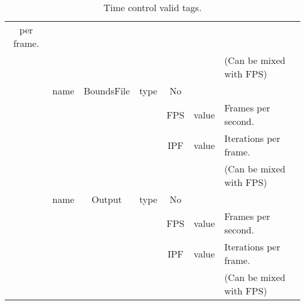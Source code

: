 \begin{table}[h!b!p!]
\begin{tabular}{| c | c | c | c | c | c | l | }
		       per frame. \\
		       &      &                &        &         &       & (Can be 
		       mixed with FPS) \\ 
		\hline
		       & name & BoundsFile     & type   & No      &       & \\
		       &      &                &        & FPS     & value & Frames per 
		       second. \\
		       &      &                &        & IPF     & value & Iterations 
		       per frame. \\
		       &      &                &        &         &       & (Can be 
		       mixed with FPS) \\ 
		\hline
		       & name & Output         & type   & No      &       & \\
		       &      &                &        & FPS     & value & Frames per second. \\
		       &      &                &        & IPF     & value & Iterations per frame. \\
		       &      &                &        &         &       & (Can be 
		       mixed with FPS) \\ 
		\hline
	\end{tabular}
	\caption{Time control valid tags.}
	\label{tables:caseSetup:Timing:Options}
\end{table}
%
